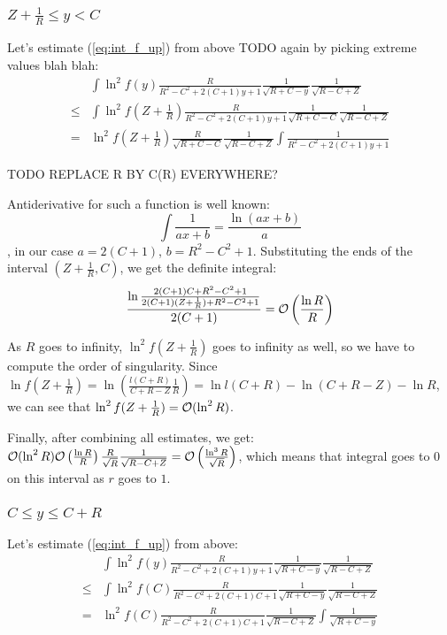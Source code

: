 \subsubsection{$Z + \frac{1}{R} \le y < C$}
Let's estimate (\ref{eq:int_f_up}) from above TODO again by picking extreme values blah blah:
\begin{align*}
       & \int \ln^2 f(y) \frac{R}{R^2 - C^2 + 2 (C + 1) y + 1} \frac{1}{\sqrt{R + C - y}} \frac{1}{\sqrt{R - C + Z}}
\\ \le & \int \ln^2 f(Z + \frac{1}{R}) \frac{R}{R^2 - C^2 + 2 (C + 1) y + 1} \frac{1}{\sqrt{R + C - C}} \frac{1}{\sqrt{R - C + Z}}
\\  =  & \ln^2 f(Z + \frac{1}{R})  \frac{R}{\sqrt{R + C - C}} \frac{1}{\sqrt{R - C + Z}} \int \frac{1}{R^2 - C^2 + 2 (C + 1) y + 1}
\end{align*}

TODO REPLACE R BY C(R) EVERYWHERE?

Antiderivative for such a function is well known:
\[
\int \frac{1}{a x + b} = \frac{\ln (a x + b)}{a}
\]
, in our case $a = 2 (C + 1)$, $b = R^2 - C^2 + 1$. Substituting the ends of the interval $(Z + \frac{1}{R}, C)$, we get the definite integral:
\[
\frac{\ln \frac{2 (C + 1) C + R^2 - C^2 + 1}{2 (C + 1) (Z + \frac{1}{R}) + R^2 - C^2 + 1}}{2 (C + 1)} = \mcO\left( \frac{\ln R}{R} \right)
\]

As $R$ goes to infinity, $\ln^2 f(Z + \frac{1}{R})$ goes to infinity as well, so we have to compute the order of singularity. Since $\ln f(Z + \frac{1}{R}) = \ln \left( \frac{l(C + R)}{C + R - Z} \frac{1}{R} \right) = \ln l(C + R) - \ln (C + R - Z) - \ln R$, we can see that $\ln^2 f(Z + \frac{1}{R}) = \mcO (\ln^2 R)$.

Finally, after combining all estimates, we get: $\mcO (\ln^2 R) \mcO\left( \frac{\ln R}{R} \right) \frac{R}{\sqrt{R}} \frac{1}{\sqrt{R - C + Z}} = \mcO\left( \frac{\ln^3 R}{\sqrt{R}} \right)$, which means that integral goes to $0$ on this interval as $r$ goes to $1$.

\subsubsection{$C \le y \le C + R$}

Let's estimate (\ref{eq:int_f_up}) from above:
\begin{align*}
       & \int \ln^2 f(y) \frac{R}{R^2 - C^2 + 2 (C + 1) y + 1} \frac{1}{\sqrt{R + C - y}} \frac{1}{\sqrt{R - C + Z}}
\\ \le & \int \ln^2 f(C) \frac{R}{R^2 - C^2 + 2 (C + 1) C + 1} \frac{1}{\sqrt{R + C - y}} \frac{1}{\sqrt{R - C + Z}}
\\ =   & \ln^2 f(C) \frac{R}{R^2 - C^2 + 2 (C + 1) C + 1} \frac{1}{\sqrt{R - C + Z}} \int \frac{1}{\sqrt{R + C - y}}
\end{align*}

